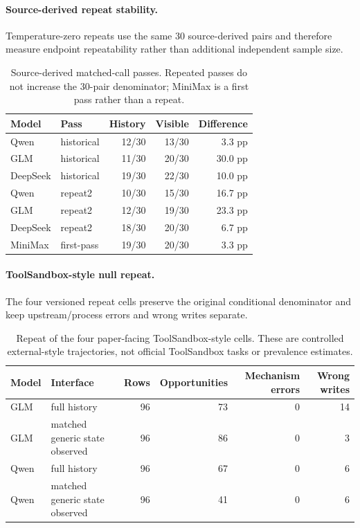 \paragraph{Source-derived repeat stability.}
Temperature-zero repeats use the same 30 source-derived pairs and therefore measure endpoint repeatability rather than additional independent sample size.
\begin{table}[H]
\centering
\small
\begin{tabular}{llrrr}
\toprule
Model & Pass & History & Visible & Difference \\
\midrule
Qwen & historical & 12/30 & 13/30 & 3.3 pp \\
GLM & historical & 11/30 & 20/30 & 30.0 pp \\
DeepSeek & historical & 19/30 & 22/30 & 10.0 pp \\
Qwen & repeat2 & 10/30 & 15/30 & 16.7 pp \\
GLM & repeat2 & 12/30 & 19/30 & 23.3 pp \\
DeepSeek & repeat2 & 18/30 & 20/30 & 6.7 pp \\
MiniMax & first-pass & 19/30 & 20/30 & 3.3 pp \\
\bottomrule
\end{tabular}
\caption{Source-derived matched-call passes. Repeated passes do not increase the 30-pair denominator; MiniMax is a first pass rather than a repeat.}
\label{tab:supp-source-repeat}
\end{table}

\paragraph{ToolSandbox-style null repeat.}
The four versioned repeat cells preserve the original conditional denominator and keep upstream/process errors and wrong writes separate.
\begin{table}[H]
\centering
\small
\begin{tabular}{llrrrr}
\toprule
Model & Interface & Rows & Opportunities & Mechanism errors & Wrong writes \\
\midrule
GLM & full history & 96 & 73 & 0 & 14 \\
GLM & matched generic state observed & 96 & 86 & 0 & 3 \\
Qwen & full history & 96 & 67 & 0 & 6 \\
Qwen & matched generic state observed & 96 & 41 & 0 & 6 \\
\bottomrule
\end{tabular}
\caption{Repeat of the four paper-facing ToolSandbox-style cells. These are controlled external-style trajectories, not official ToolSandbox tasks or prevalence estimates.}
\label{tab:supp-toolsandbox-null-repeat}
\end{table}


